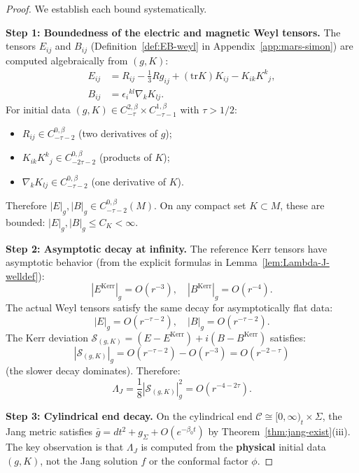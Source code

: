 \documentclass[12pt]{article}
\theoremstyle{plain}
\theoremstyle{definition}
\theoremstyle{remark}
\newcommand{\tr}{\mathrm{tr}}
\newcommand{\bg}{\bar{g}}
\newcommand{\Hoelder}{\beta}
\begin{document}
\begin{proof}
We establish each bound systematically.

\textbf{Step 1: Boundedness of the electric and magnetic Weyl tensors.}
The tensors $E_{ij}$ and $B_{ij}$ (Definition~\ref{def:EB-weyl} in Appendix~\ref{app:mars-simon}) are computed algebraically from $(g, K)$:
\begin{align*}
E_{ij} &= R_{ij} - \tfrac{1}{3}Rg_{ij} + (\tr K)K_{ij} - K_{ik}K^k{}_j, \\
B_{ij} &= \epsilon_i{}^{kl}\nabla_k K_{lj}.
\end{align*}
For initial data $(g, K) \in C^{2,\Hoelder}_{-\tau} \times C^{1,\Hoelder}_{-\tau-1}$ with $\tau > 1/2$:
\begin{itemize}
    \item $R_{ij} \in C^{0,\Hoelder}_{-\tau-2}$ (two derivatives of $g$);
    \item $K_{ik}K^k{}_j \in C^{0,\Hoelder}_{-2\tau-2}$ (products of $K$);
    \item $\nabla_k K_{lj} \in C^{0,\Hoelder}_{-\tau-2}$ (one derivative of $K$).
\end{itemize}
Therefore $|E|_g, |B|_g \in C^{0,\Hoelder}_{-\tau-2}(M)$. On any compact set $K \subset M$, these are bounded: $|E|_g, |B|_g \leq C_K < \infty$.

\textbf{Step 2: Asymptotic decay at infinity.}
The reference Kerr tensors have asymptotic behavior (from the explicit formulas in Lemma~\ref{lem:Lambda-J-welldef}):
\[
|E^{\mathrm{Kerr}}|_g = O(r^{-3}), \quad |B^{\mathrm{Kerr}}|_g = O(r^{-4}).
\]
The actual Weyl tensors satisfy the same decay for asymptotically flat data:
\[
|E|_g = O(r^{-\tau-2}), \quad |B|_g = O(r^{-\tau-2}).
\]
The Kerr deviation $\mathcal{S}_{(g,K)} = (E - E^{\mathrm{Kerr}}) + i(B - B^{\mathrm{Kerr}})$ satisfies:
\[
|\mathcal{S}_{(g,K)}|_g = O(r^{-\tau-2}) - O(r^{-3}) = O(r^{-2-\tau})
\]
(the slower decay dominates). Therefore:
\[
\Lambda_J = \frac{1}{8}|\mathcal{S}_{(g,K)}|^2_g = O(r^{-4-2\tau}).
\]

\textbf{Step 3: Cylindrical end decay.}
On the cylindrical end $\mathcal{C} \cong [0,\infty)_t \times \Sigma$, the Jang metric satisfies $\bg = dt^2 + g_\Sigma + O(e^{-\beta_0 t})$ by Theorem~\ref{thm:jang-exist}(iii). The key observation is that $\Lambda_J$ is computed from the \textbf{physical} initial data $(g, K)$, not the Jang solution $f$ or the conformal factor $\phi$.
\end{proof}

\end{document}
